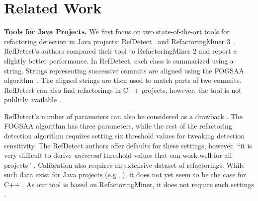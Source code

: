 \section{Related Work}
\noindent\textbf{Tools for Java Projects.} We first focus on two state-of-the-art tools for refactoring detection in Java projects: RefDetect~\cite{ieeeAccess21refdetect} and RefactoringMiner 3~\cite{tosem24refactoringMiner3}. RefDetect's authors compared their tool to RefactoringMiner 2 \cite{tse20refactoringMiner2} and report a slightly better performance. In RefDetect, each class is summarized using a string. Strings representing successive commits are aligned using the FOGSAA algorithm~\cite{nature13stringAlignmentAlgorithm}. The aligned strings are then used to match parts of two commits. RefDetect can also find refactorings in C++ projects, however, the tool is not publicly available \cite{RefDetectWebsite}. %

RefDetect's number of parameters can also be considered as a drawback \cite{tse20refactoringMiner2}. The FOGSAA algorithm has three parameters, while the rest of the refactoring detection algorithm requires setting six threshold values for tweaking detection sensitivity. The RefDetect authors offer defaults for these settings, however, ``it is very difficult to derive \emph{universal} threshold values that can work well for all projects'' \cite{tse20refactoringMiner2}.
Calibration also requires an extensive dataset of refactorings. While such data exist for Java projects (e.g., \cite{icse18refactoringMiner,tse20refactoringMiner2}), it does not yet seem to be the case for C++ \cite{ieeeAccess21refdetect}. %
As our tool is based on RefactoringMiner, it does not require such settings \cite{tosem24refactoringMiner3}.

